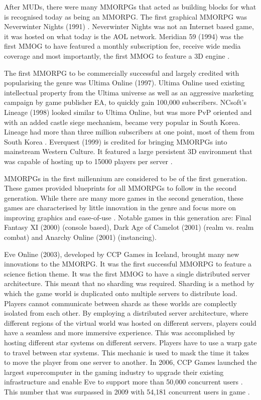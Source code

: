 \documentclass[journal,oneside,a4paper,onecolumn]{IEEEtran}
\begin{document}
After \acp{MUD}, there were many \acp{MMORPG} that acted as building blocks for what is recognised today as being an \ac{MMORPG}. The first graphical \ac{MMORPG} was Neverwinter Nights (1991) \cite{nwn_aol}. Neverwinter Nights was not an Internet based game, it was hosted on what today is the AOL network. Meridian 59 (1994) was the first \ac{MMOG} to have featured a monthly subscription fee, receive wide media coverage and most importantly, the first \ac{MMOG} to feature a 3D engine \cite{meridian59_hist}.

The first \ac{MMORPG} to be commercially successful and largely credited with popularising the genre was Ultima Online (1997). Ultima Online used existing intellectual property from the Ultima universe as well as an aggressive marketing campaign by game publisher EA, to quickly gain 100,000 subscribers. NCsoft's Lineage (1998) looked similar to Ultima Online, but was more \ac{PvP} oriented and with an added castle siege mechanism, became very popular in South Korea. Lineage had more than three million subscribers at one point, most of them from South Korea \cite{mmog_subscriptions}. Everquest (1999) is credited for bringing \acp{MMORPG} into mainstream Western Culture. It featured a large persistent 3D environment that was capable of hosting up to 15000 players per server \cite{everquest2_capacity}.

\acp{MMORPG} in the first millennium are considered to be of the first generation. These games provided blueprints for all \acp{MMORPG}
to follow in the second generation. While there are many more games in the second generation, these games are characterised by little innovation
in the genre and focus more on improving graphics and ease-of-use \cite{mmog_past_present_future}. Notable games in this generation are: Final Fantasy XI (2000) (console based), Dark Age of Camelot (2001) (realm vs. realm combat) and Anarchy Online (2001) (instancing).

Eve Online (2003), developed by CCP Games in Iceland, brought many new innovations to the \ac{MMORPG}. It was the first successful MMORPG to feature a science fiction theme. It was the first MMOG to have a single distributed server architecture. This meant that no sharding was required. Sharding is a method by which the game world is duplicated onto multiple servers to distribute load. Players cannot communicate between shards as these worlds are complectly isolated from each other. By employing a distributed server architecture, where different regions of the virtual world was hosted on different servers, players could have a seamless and more immersive experience. This was accomplished by hosting different star systems on different servers. Players have to use a warp gate to travel between star systems. This mechanic is used to mask the time it takes to move the player from one server to another. In 2006, CCP Games launched the largest supercomputer in the gaming industry to upgrade their existing infrastructure and enable Eve to support more than 50,000 concurrent users \cite{eve_launces_supcom}. This number that was surpassed in 2009 with 54,181 concurrent users in game \cite{eve_pcu}.
\end{document}
